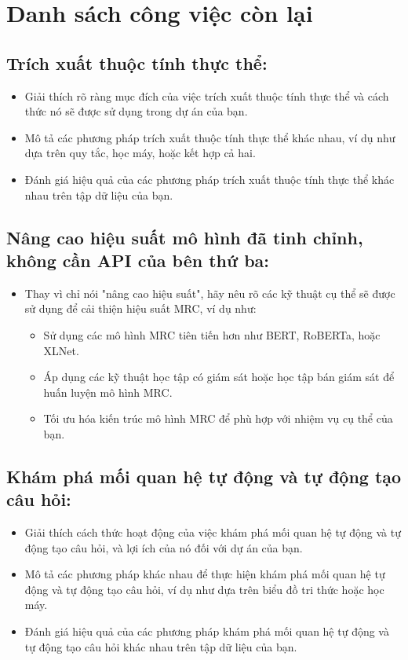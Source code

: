 \section{Danh sách công việc còn lại}\label{sec:danh-sach-cong-viec-con-lai}

\subsection{Trích xuất thuộc tính thực thể:}\label{subsec:2.-trien-khai-trich-xuat-thuoc-tinh-thuc-the:}
\begin{itemize}
    \item Giải thích rõ ràng mục đích của việc trích xuất thuộc tính thực thể và cách thức nó sẽ được sử dụng trong dự án của bạn.
    \item Mô tả các phương pháp trích xuất thuộc tính thực thể khác nhau, ví dụ như dựa trên quy tắc, học máy, hoặc kết hợp cả hai.
    \item Đánh giá hiệu quả của các phương pháp trích xuất thuộc tính thực thể khác nhau trên tập dữ liệu của bạn.
\end{itemize}


\subsection{Nâng cao hiệu suất mô hình đã tinh chỉnh, không cần API của bên thứ ba:}\label{subsec:3.-nang-cao-hieu-suat-mrc-(machine-reading-comprehension)-khong-can-api-cua-ben-thu-ba:}
\begin{itemize}
    \item Thay vì chỉ nói "nâng cao hiệu suất", hãy nêu rõ các kỹ thuật cụ thể sẽ được sử dụng để cải thiện hiệu suất MRC, ví dụ như:
    \begin{itemize}
        \item Sử dụng các mô hình MRC tiên tiến hơn như BERT, RoBERTa, hoặc XLNet.
        \item Áp dụng các kỹ thuật học tập có giám sát hoặc học tập bán giám sát để huấn luyện mô hình MRC.
        \item Tối ưu hóa kiến trúc mô hình MRC để phù hợp với nhiệm vụ cụ thể của bạn.
    \end{itemize}
\end{itemize}


\subsection{Khám phá mối quan hệ tự động và tự động tạo câu hỏi:}\label{subsec:4.-kham-pha-moi-quan-he-tu-ong-va-tu-ong-tao-cau-hoi:}
\begin{itemize}
    \item Giải thích cách thức hoạt động của việc khám phá mối quan hệ tự động và tự động tạo câu hỏi, và lợi ích của nó đối với dự án của bạn.
    \item Mô tả các phương pháp khác nhau để thực hiện khám phá mối quan hệ tự động và tự động tạo câu hỏi, ví dụ như dựa trên biểu đồ tri thức hoặc học máy.
    \item Đánh giá hiệu quả của các phương pháp khám phá mối quan hệ tự động và tự động tạo câu hỏi khác nhau trên tập dữ liệu của bạn.
\end{itemize}


